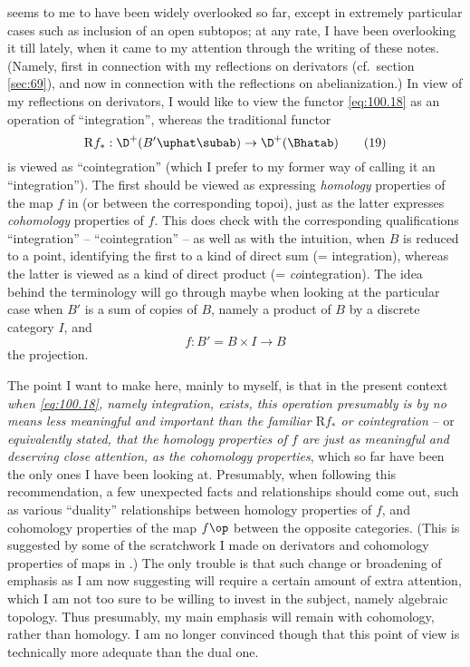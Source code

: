 seems to me to have been widely overlooked so far, except in extremely
particular cases such as inclusion of an open subtopos; at any rate, I
have been overlooking it till lately, when it came to my attention
through the writing of these notes. (Namely, first in
connection with my reflections on derivators (cf.\ section
\ref{sec:69}), and now in connection with the reflections on
abelianization.) In view of my reflections on derivators, I would like
to view the functor \eqref{eq:100.18} as an operation of
``integration'', whereas the traditional functor
\begin{equation}
  \label{eq:100.19}
  \mathrm Rf_* : \D^+({B'}\uphat\subab) \to \D^+(\Bhatab)\tag{19}
\end{equation}
is viewed as ``cointegration'' (which I prefer to my former way of
calling it an ``integration''). The first should be viewed as
expressing \emph{homology} properties of the map $f$ in \Cat{} (or
between the corresponding topoi), just as the latter expresses
\emph{cohomology} properties of $f$. This does check with the
corresponding qualifications ``integration'' -- ``cointegration'' --
as well as with the intuition, when $B$ is reduced to a point,
identifying the first to a kind of direct sum (= integration), whereas
the latter is viewed as a kind of direct product (=
\emph{co}integration). The idea behind the terminology will go through
maybe when looking at the particular case when $B'$ is a sum of copies
of $B$, namely a product of $B$ by a discrete category $I$, and
\[f : B'=B\times I\to B\]
the projection.

The point I want to make here, mainly to myself, is that in the
present context \emph{when \eqref{eq:100.18}, namely integration,
  exists, this operation presumably is by no means less meaningful and
  important than the familiar $\mathrm Rf_*$ or cointegration} -- or
\emph{equivalently stated, that the homology properties of $f$ are
  just as meaningful and deserving close attention, as the cohomology
  properties}, which so far have been the only ones I have been
looking at. Presumably, when following this recommendation, a few
unexpected facts and relationships should come out, such as various
``duality'' relationships between homology properties of $f$, and
cohomology properties of the map $f\op$ between the opposite
categories. (This is suggested by some of the scratchwork I made on
derivators and cohomology properties of maps in \Cat.) The only
trouble is that such change or broadening of emphasis as I am now
suggesting will require a certain amount of extra attention, which I
am not too sure to be willing to invest in the subject, namely
algebraic topology. Thus presumably, my main emphasis will remain with
cohomology, rather than homology. I am no longer convinced though that
this point of view is technically more adequate than the dual one.

